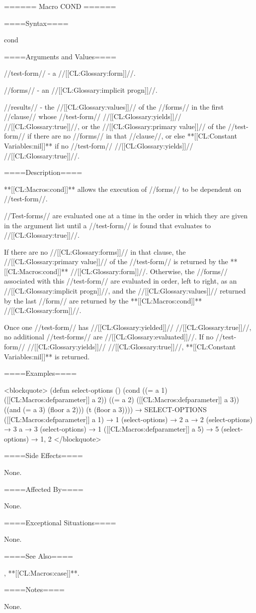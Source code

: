====== Macro COND ======

====Syntax====

\DefmacWithValues cond {} {}


====Arguments and Values====

//test-form// - a //[[CL:Glossary:form]]//.

//forms// - an //[[CL:Glossary:implicit progn]]//.

//results// - the //[[CL:Glossary:values]]// of the //forms// in the first //clause// whose //test-form// //[[CL:Glossary:yields]]// //[[CL:Glossary:true]]//, or the //[[CL:Glossary:primary value]]// of the //test-form// if there are no //forms// in that //clause//, or else **[[CL:Constant Variables:nil]]** if no //test-form// //[[CL:Glossary:yields]]// //[[CL:Glossary:true]]//.

====Description====

**[[CL:Macros:cond]]** allows the execution of //forms// to be dependent on //test-form//.

//Test-forms// are evaluated one at a time in the order in which they are given in the argument list until a //test-form// is found that evaluates to //[[CL:Glossary:true]]//.

If there are no //[[CL:Glossary:forms]]// in that clause, the //[[CL:Glossary:primary value]]// of the //test-form// is returned by the **[[CL:Macros:cond]]** //[[CL:Glossary:form]]//. Otherwise, the //forms// associated with this //test-form// are evaluated in order, left to right, as an //[[CL:Glossary:implicit progn]]//, and the //[[CL:Glossary:values]]// returned by the last //form// are returned by the **[[CL:Macros:cond]]** //[[CL:Glossary:form]]//.

Once one //test-form// has //[[CL:Glossary:yielded]]// //[[CL:Glossary:true]]//, no additional //test-forms// are //[[CL:Glossary:evaluated]]//. If no //test-form// //[[CL:Glossary:yields]]// //[[CL:Glossary:true]]//, **[[CL:Constant Variables:nil]]** is returned.

====Examples====

<blockquote> (defun select-options () (cond ((= a 1) ([[CL:Macros:defparameter]] a 2)) ((= a 2) ([[CL:Macros:defparameter]] a 3)) ((and (= a 3) (floor a 2))) (t (floor a 3)))) → SELECT-OPTIONS ([[CL:Macros:defparameter]] a 1) → 1 (select-options) → 2 a → 2 (select-options) → 3 a → 3 (select-options) → 1 ([[CL:Macros:defparameter]] a 5) → 5 (select-options) → 1, 2 </blockquote>

====Side Effects====

None.

====Affected By====

None.

====Exceptional Situations====

None.

====See Also====

, **[[CL:Macros:case]]**.

====Notes====

None.



